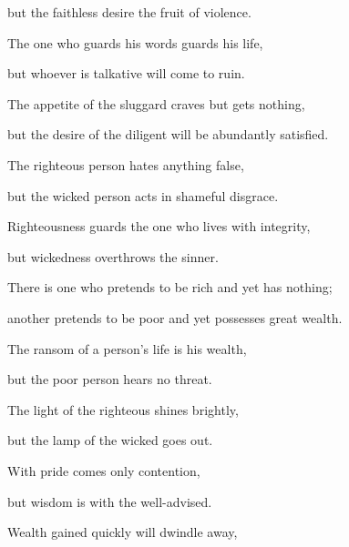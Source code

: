 {\par }{\Q but the faithless
desire
the fruit of violence.
\par }{\Q {}The one who guards
his words
guards
his life,
\par }{\Q but whoever is talkative
will come to ruin.
\par }{\Q {}The appetite
of the sluggard
craves
but gets nothing,
\par }{\Q but the desire
of the diligent
will be abundantly satisfied.
\par }{\Q {}The righteous
person hates
anything
false,
\par }{\Q but the wicked person
acts in shameful
disgrace.
\par }{\Q {}Righteousness
guards
the one who lives with integrity,
\par }{\Q but wickedness
overthrows
the sinner.
\par }{\Q {}There is
one who pretends
to be rich
and yet has nothing;
\par }{\Q another pretends
to be poor
and yet possesses
great
wealth.
\par }{\Q {}The ransom
of a person’s
life
is his wealth,
\par }{\Q but the poor
person hears
no
threat.
\par }{\Q {}The light
of the righteous
shines brightly,

\par }{\Q but
the lamp
of the wicked
goes out.
\par }{\Q {}With pride
comes only
contention,
\par }{\Q but wisdom
is with
the well-advised.
\par }{\Q {}Wealth
gained quickly
will dwindle
away,

}
